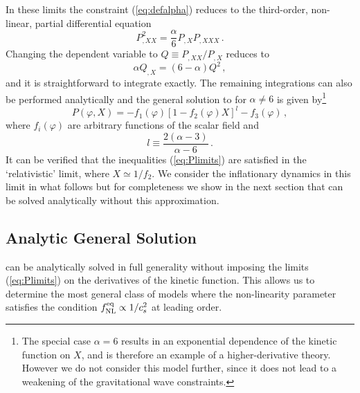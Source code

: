 In these limits the constraint (\ref{eq:defalpha}) reduces to the 
third-order, non-linear, partial differential equation
% 
\begin{equation}
\label{eq:pde-multi}
P^2_{,XX} = \frac{\alpha}{6} P_{,X} P_{,XXX} \,.
\end{equation}
% 
Changing the dependent variable to $Q \equiv P_{,XX}/P_{,X}$ 
reduces  to
%  
\begin{equation}
\label{eq:Qdefn-multi}
\alpha Q_{,X} = (6-\alpha )Q^2 \,,
\end{equation}
% 
and it is straightforward to integrate  
exactly. The remaining integrations can also be performed analytically 
and the general solution to  for $\alpha \ne
6$ is given by\footnote{The special case $\alpha =6$ results in an 
exponential dependence of the kinetic function on $X$, and is 
therefore an example of a higher-derivative theory. However we 
do not consider this model further, since it does not lead to a 
weakening of the gravitational wave constraints.}
% 
\begin{equation}
\label{eq:gensoln-multi}
P (\varphi , X) = -f_1 (\varphi ) \left[ 1-f_2 (\varphi ) X 
\right]^l -f_3(\varphi ) \,,
\end{equation}
% 
where $f_i (\varphi )$ are arbitrary functions of the scalar 
field and
%  
\begin{equation}
l \equiv \frac{2(\alpha -3 )}{\alpha -6} \, . 
\end{equation}
% 
It can be verified that the inequalities (\ref{eq:Plimits}) 
are satisfied in the `relativistic' limit, where $X \simeq 1/f_2$.
We consider the inflationary dynamics in this limit in what follows but for
completeness we show in the next section that  can be solved
analytically without this approximation. 

\subsection{Analytic General Solution}
\label{sec:apx-multi}
 can be analytically solved in full 
generality without imposing the limits (\ref{eq:Plimits}) on the 
derivatives of the kinetic function. This allows us to determine the 
most general class of models where the non-linearity parameter 
satisfies the condition $f_{\mathrm{NL}}^{\mathrm{eq}} \propto 1/c_s^2$ at leading order. 

